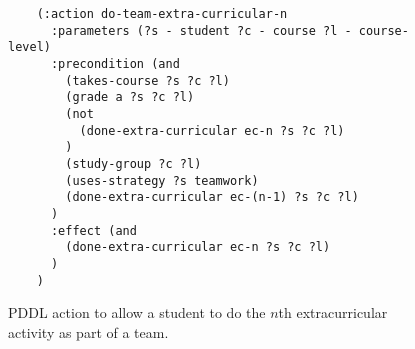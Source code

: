 \begin{figure}[t]
    \begin{lstlisting}
    (:action do-team-extra-curricular-n
      :parameters (?s - student ?c - course ?l - course-level)
      :precondition (and 
        (takes-course ?s ?c ?l)
        (grade a ?s ?c ?l)
        (not
          (done-extra-curricular ec-n ?s ?c ?l)
        )
        (study-group ?c ?l)
        (uses-strategy ?s teamwork)
        (done-extra-curricular ec-(n-1) ?s ?c ?l)
      )
      :effect (and 
        (done-extra-curricular ec-n ?s ?c ?l)
      )
    )
    \end{lstlisting}
    \caption{PDDL action to allow a student to do the $n$th extracurricular activity as part of a team.}\label{fig:pddl-action-team-extra-curricular-n}
    \end{figure}